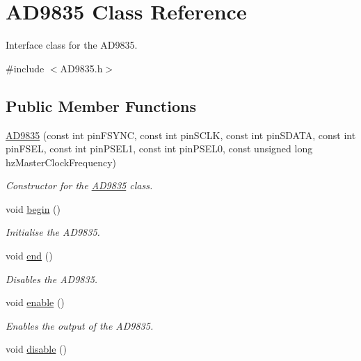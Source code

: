 \hypertarget{class_a_d9835}{
\section{AD9835 Class Reference}
\label{class_a_d9835}
}


Interface class for the AD9835.  




{\ttfamily \#include $<$AD9835.h$>$}

\subsection*{Public Member Functions}
\begin{DoxyCompactItemize}
\item 
\hyperlink{class_a_d9835_afe01ac229ed5836ba172cabeb40f4ca2}{AD9835} (const int pinFSYNC, const int pinSCLK, const int pinSDATA, const int pinFSEL, const int pinPSEL1, const int pinPSEL0, const unsigned long hzMasterClockFrequency)
\begin{DoxyCompactList}\small\item\em Constructor for the \hyperlink{class_a_d9835}{AD9835} class. \end{DoxyCompactList}\item 
void \hyperlink{class_a_d9835_abd6cd79aa94760c1bfbb86d77dc493d6}{begin} ()
\begin{DoxyCompactList}\small\item\em Initialise the AD9835. \end{DoxyCompactList}\item 
\hypertarget{class_a_d9835_a8e6ec0591eac9218c379fadfacaf41af}{
void \hyperlink{class_a_d9835_a8e6ec0591eac9218c379fadfacaf41af}{end} ()}
\label{class_a_d9835_a8e6ec0591eac9218c379fadfacaf41af}

\begin{DoxyCompactList}\small\item\em Disables the AD9835. \end{DoxyCompactList}\item 
\hypertarget{class_a_d9835_a6434f761a4353f0483c5d08191400f8c}{
void \hyperlink{class_a_d9835_a6434f761a4353f0483c5d08191400f8c}{enable} ()}
\label{class_a_d9835_a6434f761a4353f0483c5d08191400f8c}

\begin{DoxyCompactList}\small\item\em Enables the output of the AD9835. \end{DoxyCompactList}\item 
\hypertarget{class_a_d9835_ac9f727d658e71b63fec2a81eb60fc82b}{
void \hyperlink{class_a_d9835_ac9f727d658e71b63fec2a81eb60fc82b}{disable} ()}
\label{class_a_d9835_ac9f727d658e71b63fec2a81eb60fc82b}


\end{DoxyCompactItemize}
